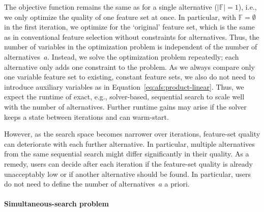 \documentclass{article}
\theoremstyle{definition}
\begin{document}
%
The objective function remains the same as for a single alternative ($|\mathbb{F}| = 1$), i.e., we only optimize the quality of one feature set at once.
In particular, with $\mathbb{F} = \emptyset$ in the first iteration, we optimize for the `original' feature set, which is the same as in conventional feature selection without constraints for alternatives.
Thus, the number of variables in the optimization problem is independent of the number of alternatives~$a$.
Instead, we solve the optimization problem repeatedly; each alternative only adds one constraint to the problem.
As we always compare only one variable feature set to existing, constant feature sets, we also do not need to introduce auxiliary variables as in Equation~\ref{eq:afs:product-linear}.
Thus, we expect the runtime of exact, e.g., solver-based, sequential search to scale well with the number of alternatives.
Further runtime gains may arise if the solver keeps a state between iterations and can warm-start.

However, as the search space becomes narrower over iterations, feature-set quality can deteriorate with each further alternative.
In particular, multiple alternatives from the same sequential search might differ significantly in their quality.
As a remedy, users can decide after each iteration if the feature-set quality is already unacceptably low or if another alternative should be found.
In particular, users do not need to define the number of alternatives~$a$ a priori.

\paragraph{Simultaneous-search problem}
\end{document}

